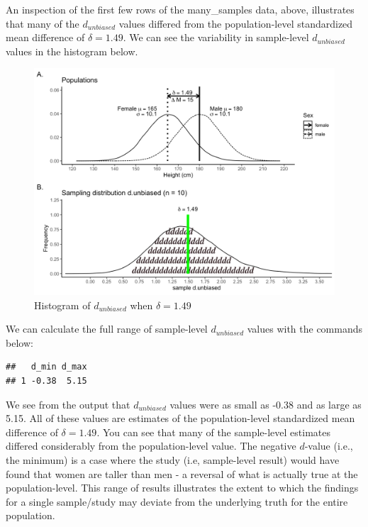 \documentclass[
]{krantz}
\makeatletter
\newenvironment{Shaded}{\begin{snugshade}}{\end{snugshade}}
\newcommand{\DataTypeTok}[1]{\textcolor[rgb]{0.27,0.27,0.27}{#1}}
\newcommand{\KeywordTok}[1]{\textcolor[rgb]{0.27,0.27,0.27}{\textbf{#1}}}
\newcommand{\NormalTok}[1]{#1}
\newcommand{\OperatorTok}[1]{\textcolor[rgb]{0.43,0.43,0.43}{\textbf{#1}}}
\newcommand{\StringTok}[1]{\textcolor[rgb]{0.5,0.5,0.5}{#1}}
\newenvironment{kframe}{%
\medskip{}
\setlength{\fboxsep}{.8em}
 \def\at@end@of@kframe{}%
 \ifinner\ifhmode%
  \def\at@end@of@kframe{\end{minipage}}%
  \begin{minipage}{\columnwidth}%
 \fi\fi%
 \def\FrameCommand##1{\hskip\@totalleftmargin \hskip-\fboxsep
 \colorbox{shadecolor}{##1}\hskip-\fboxsep
     \hskip-\linewidth \hskip-\@totalleftmargin \hskip\columnwidth}%
 \MakeFramed {\advance\hsize-\width
   \@totalleftmargin\z@ \linewidth\hsize
   \@setminipage}}%
 {\par\unskip\endMakeFramed%
 \at@end@of@kframe}
\renewenvironment{Shaded}{\begin{kframe}}{\end{kframe}}
\makeatother
\begin{document}
An inspection of the first few rows of the many\_samples data, above, illustrates that many of the \(d_{unbiased}\) values differed from the population-level standardized mean difference of \(\delta = 1.49\). We can see the variability in sample-level \(d_{unbiased}\) values in the histogram below.

\begin{figure}
\includegraphics[width=0.95\linewidth]{ch_samples/images/d_dist} \caption{Histogram of $d_{unbiased}$ when $\delta = 1.49$}\label{fig:ddist}
\end{figure}

We can calculate the full range of sample-level \(d_{unbiased}\) values with the commands below:

\begin{Shaded}
\end{Shaded}

\begin{verbatim}
##   d_min d_max
## 1 -0.38  5.15
\end{verbatim}

We see from the output that \(d_{unbiased}\) values were as small as -0.38 and as large as 5.15. All of these values are estimates of the population-level standardized mean difference of \(\delta = 1.49\). You can see that many of the sample-level estimates differed considerably from the population-level value. The negative \(d\)-value (i.e., the minimum) is a case where the study (i.e, sample-level result) would have found that women are taller than men - a reversal of what is actually true at the population-level. This range of results illustrates the extent to which the findings for a single sample/study may deviate from the underlying truth for the entire population.
\end{document}
